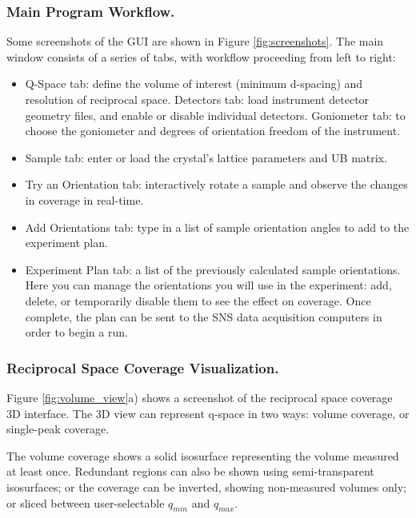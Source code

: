 \documentclass[final]{iucr}              %
\begin{document}
\subsubsection{Main Program Workflow.}
Some screenshots of the GUI are shown in Figure \ref{fig:screenshots}. The main
window consists of a series of tabs, with workflow proceeding from left to right:  

\begin{itemize}
  \item Q-Space tab: define the volume of interest (minimum d-spacing) and
resolution of reciprocal space. Detectors tab: load instrument detector geometry
files, and enable or disable individual detectors. Goniometer tab: to choose the
goniometer and degrees of orientation freedom of the instrument.
   
  \item Sample tab: enter or load the crystal's lattice parameters and UB matrix.

  \item Try an Orientation tab: interactively rotate a sample and observe the
  changes in coverage in real-time.
   
  \item Add Orientations tab: type in a list of sample orientation angles to add
  to the experiment plan.
 
  \item Experiment Plan tab: a list of the previously calculated sample orientations.
Here you can manage the orientations you will use in the experiment: add,
delete, or temporarily disable them to see the effect on coverage. Once
complete, the plan can be sent to the SNS data acquisition computers in order to
begin a run.
    
\end{itemize} 



\subsubsection{Reciprocal Space Coverage Visualization.}
Figure \ref{fig:volume_view}a) shows a screenshot of the reciprocal space
coverage 3D interface. The 3D view can represent q-space in two ways: volume coverage, or single-peak
coverage.  

The volume coverage shows a solid isosurface representing the volume measured at
least once. Redundant regions can also be shown using semi-transparent
isosurfaces; or the coverage can be inverted, showing non-measured volumes only;
or sliced between user-selectable $q_{min}$ and $q_{max}$.        
\end{document}
